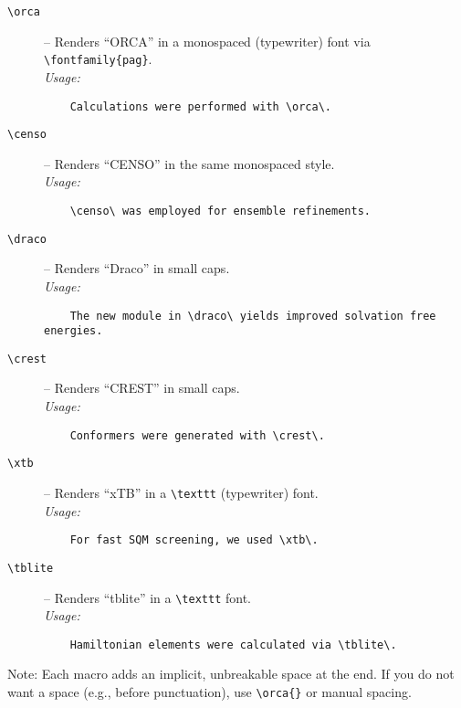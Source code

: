 \documentclass[a4paper,12pt]{article}
\begin{document}
\begin{description}
  \item[\texttt{\textbackslash orca}]  – Renders “ORCA” in a monospaced (typewriter) font via \verb|\fontfamily{pag}|.\\
    \textit{Usage:} 
    \begin{verbatim}
    Calculations were performed with \orca\.
    \end{verbatim}

  \item[\texttt{\textbackslash censo}] – Renders “CENSO” in the same monospaced style.\\
    \textit{Usage:} 
    \begin{verbatim}
    \censo\ was employed for ensemble refinements.
    \end{verbatim}

    \item[\texttt{\textbackslash draco}] – Renders “Draco” in small caps.\\
    \textit{Usage:}
    \begin{verbatim}
    The new module in \draco\ yields improved solvation free energies.
    \end{verbatim}

    \item[\texttt{\textbackslash crest}] – Renders “CREST” in small caps.\\
    \textit{Usage:}
    \begin{verbatim}
    Conformers were generated with \crest\.
    \end{verbatim}

    \item[\texttt{\textbackslash xtb}]   – Renders “xTB” in a \verb|\texttt| (typewriter) font.\\
    \textit{Usage:}
    \begin{verbatim}
    For fast SQM screening, we used \xtb\.
    \end{verbatim}

    \item[\texttt{\textbackslash tblite}] – Renders “tblite” in a \verb|\texttt| font.\\
    \textit{Usage:}
    \begin{verbatim}
    Hamiltonian elements were calculated via \tblite\.
    \end{verbatim}
\end{description}

\noindent Note: Each macro adds an implicit, unbreakable space at the end. If you do not want a space (e.g., before punctuation), use \verb|\orca{}| or manual spacing.
\end{document}
